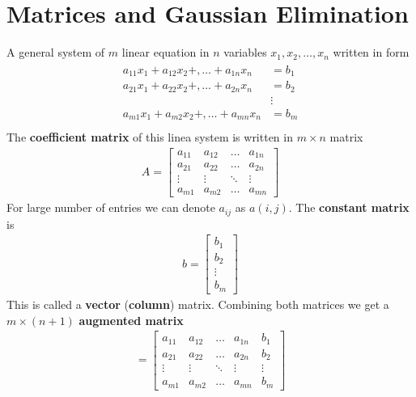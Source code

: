     \section{Matrices and Gaussian Elimination}
        A general system of $m$ linear equation in $n$ variables $x_1, x_2, \dots, x_n$ written in form 
        \begin{align}
            \begin{aligned}
                \label{eq:general system}
                a_{11}x_1 + a_{12}x_2 + , \dots + a_{1n}x_n &= b_1 \\
                a_{21}x_1 + a_{22}x_2 + , \dots + a_{2n}x_n &= b_2 \\
                                                            &\vdots \\
                a_{m1}x_1 + a_{m2}x_2 + , \dots + a_{mn}x_n &= b_m \\
            \end{aligned}
        \end{align}
        The \textbf{coefficient matrix} of this linea system is written in $m \times n$ matrix 
        \begin{align*}
            A = \begin{bmatrix}
                a_{11} & a_{12} & \dots & a_{1n} \\
                a_{21} & a_{22} & \dots & a_{2n} \\
                \vdots & \vdots & \ddots & \vdots \\
                a_{m1} & a_{m2} & \dots & a_{mn}
            \end{bmatrix}
        \end{align*}
        For large number of entries we can denote $a_{ij}$ as $a(i, j)$. The \textbf{constant matrix} is 
        \begin{align*}
            b = \begin{bmatrix}
                b_1 \\ b_2 \\ \vdots \\ b_m
            \end{bmatrix}
        \end{align*}
        This is called a \textbf{vector} (\textbf{column}) matrix. Combining both matrices we get a $m \times (n+1)$ \textbf{augmented matrix}
        \begin{align*}
            [A\, b] = \begin{bmatrix}
                a_{11} & a_{12} & \dots & a_{1n} & b_1 \\
                a_{21} & a_{22} & \dots & a_{2n} & b_2 \\
                \vdots & \vdots & \ddots & \vdots & \vdots \\
                a_{m1} & a_{m2} & \dots & a_{mn} & b_m
            \end{bmatrix}
        \end{align*}

